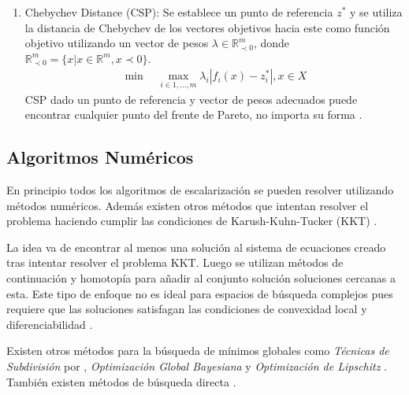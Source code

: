 \begin{enumerate}
\item Chebychev Distance (CSP): Se establece un punto de referencia $z^*$ y se utiliza la distancia de Chebychev de los vectores objetivos hacia este como funci\'on objetivo utilizando un vector de pesos $\lambda \in \mathbb{R}^m_{\prec 0}$, donde $\mathbb{R}^m_{\prec 0} = \{x | x \in \mathbb{R}^m, x \prec 0 \}$. 
    \begin{align*}
        \min \quad \max_{i \in {1,...,m}} \lambda_i |f_i(x) - z^*_i|, x \in X 
    \end{align*}
    CSP dado un punto de referencia y vector de pesos adecuados puede encontrar cualquier punto del frente de Pareto, no importa su forma .
\end{enumerate}



\subsection{Algoritmos Num\'ericos}

En principio todos los algoritmos de escalarizaci\'on se pueden resolver utilizando m\'etodos num\'ericos. Adem\'as existen otros m\'etodos  que intentan resolver el problema haciendo cumplir las condiciones de Karush-Kuhn-Tucker (KKT) .

La idea va de encontrar al menos una soluci\'on al sistema de ecuaciones creado tras intentar resolver el problema KKT. Luego se utilizan m\'etodos de continuaci\'on y homotop\'ia para añadir al conjunto soluci\'on soluciones cercanas a esta. 
Este tipo de enfoque no es ideal para espacios de b\'usqueda complejos pues requiere que las soluciones satisfagan las condiciones de convexidad local y diferenciabilidad .

Existen otros m\'etodos para la b\'usqueda de m\'inimos globales como \textit{T\'ecnicas de Subdivisi\'on} por , \textit{Optimizaci\'on Global Bayesiana}  y \textit{Optimizaci\'on de Lipschitz} . Tambi\'en existen m\'etodos de b\'usqueda directa .

